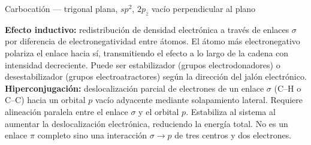 \begin{center}

\small Carbocatión --- trigonal plana, $sp^2$, $2p_z$ vacío perpendicular al plano
\end{center}

\textbf{Efecto inductivo:} redistribución de densidad
electrónica a través de enlaces $\sigma$ por diferencia de
electronegatividad entre átomos. El átomo más electronegativo
polariza el enlace hacia sí, transmitiendo el efecto a lo largo
de la cadena con intensidad decreciente. Puede ser estabilizador
(grupos electrodonadores) o desestabilizador (grupos electroatractores)
según la dirección del jalón electrónico. \\

\textbf{Hiperconjugación:} deslocalización parcial de electrones
de un enlace $\sigma$ (C--H o C--C) hacia un orbital $p$ vacío
adyacente mediante solapamiento lateral. Requiere alineación paralela
entre el enlace $\sigma$ y el orbital $p$. Estabiliza al sistema al
aumentar la deslocalización electrónica, reduciendo la energía total.
No es un enlace $\pi$ completo sino una interacción $\sigma \rightarrow p$
de tres centros y dos electrones. \\

